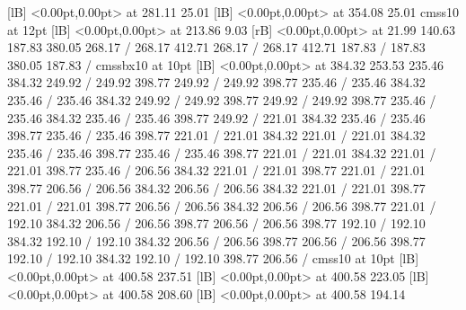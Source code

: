 {  [lB] <0.00pt,0.00pt> at 281.11 25.01
  [lB] <0.00pt,0.00pt> at 354.08 25.01
\font\picfont cmss10 at 12pt\picfont
{}  [lB] <0.00pt,0.00pt> at 213.86 9.03
 [rB] <0.00pt,0.00pt> at 21.99 140.63
\setsolid
{} 187.83 380.05 268.17 /
 268.17 412.71 268.17 /
 268.17 412.71 187.83 /
 187.83 380.05 187.83 /
\font\picfont cmssbx10 at 10pt\picfont
{}  [lB] <0.00pt,0.00pt> at 384.32 253.53
\setsolid
{} 235.46 384.32 249.92 /
 249.92 398.77 249.92 /
 249.92 398.77 235.46 /
 235.46 384.32 235.46 /
\setsolid
{} 235.46 384.32 249.92 /
 249.92 398.77 249.92 /
 249.92 398.77 235.46 /
 235.46 384.32 235.46 /
\setsolid
{} 235.46 398.77 249.92 /
\setsolid
{} 221.01 384.32 235.46 /
 235.46 398.77 235.46 /
 235.46 398.77 221.01 /
 221.01 384.32 221.01 /
\setsolid
{} 221.01 384.32 235.46 /
 235.46 398.77 235.46 /
 235.46 398.77 221.01 /
 221.01 384.32 221.01 /
\setsolid
{} 221.01 398.77 235.46 /
\setsolid
{} 206.56 384.32 221.01 /
 221.01 398.77 221.01 /
 221.01 398.77 206.56 /
 206.56 384.32 206.56 /
\setsolid
{} 206.56 384.32 221.01 /
 221.01 398.77 221.01 /
 221.01 398.77 206.56 /
 206.56 384.32 206.56 /
\setsolid
{} 206.56 398.77 221.01 /
\setsolid
{} 192.10 384.32 206.56 /
 206.56 398.77 206.56 /
 206.56 398.77 192.10 /
 192.10 384.32 192.10 /
\setsolid
{} 192.10 384.32 206.56 /
 206.56 398.77 206.56 /
 206.56 398.77 192.10 /
 192.10 384.32 192.10 /
\setsolid
{} 192.10 398.77 206.56 /
\font\picfont cmss10 at 10pt\picfont
{}  [lB] <0.00pt,0.00pt> at 400.58 237.51
  [lB] <0.00pt,0.00pt> at 400.58 223.05
  [lB] <0.00pt,0.00pt> at 400.58 208.60
  [lB] <0.00pt,0.00pt> at 400.58 194.14
\endpicture
}
